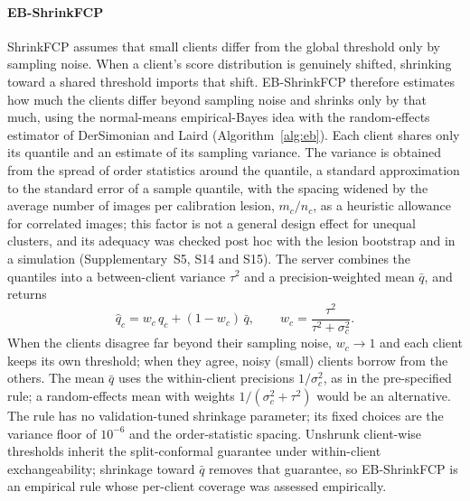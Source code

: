 \documentclass[VANCOUVER,Times1COL]{WileyNJDv5}
\begin{document}
\paragraph{EB-ShrinkFCP} ShrinkFCP assumes that small clients differ from the global threshold only by
sampling noise. When a client's score distribution is genuinely shifted, shrinking toward a shared
threshold imports that shift. EB-ShrinkFCP therefore estimates how much the clients differ beyond sampling
noise and shrinks only by that much, using the normal-means empirical-Bayes idea
\cite{efron1975stein} with the random-effects estimator of DerSimonian and Laird
\cite{dersimonian1986meta} (Algorithm~\ref{alg:eb}). Each client shares only its quantile and an estimate
of its sampling variance. The variance is obtained from the spread of order statistics around the
quantile, a standard approximation to the standard error of a sample quantile, with the spacing widened
by the average number of images per calibration lesion, $m_c/n_c$, as a heuristic allowance for
correlated images; this factor is not a general design effect for unequal clusters, and its adequacy was
checked post hoc with the lesion bootstrap and in a simulation (Supplementary~S5, S14 and S15). The server combines the quantiles into a
between-client variance $\tau^2$ and a precision-weighted mean $\bar q$, and returns
\begin{equation}
  \hat q_c = w_c\,q_c + (1-w_c)\,\bar q, \qquad w_c=\frac{\tau^2}{\tau^2+\sigma_c^2}.
  \label{eq:eb}
\end{equation}
When the clients disagree far beyond their sampling noise, $w_c\to1$ and each client keeps its own
threshold; when they agree, noisy (small) clients borrow from the others. The mean $\bar q$ uses the
within-client precisions $1/\sigma_c^2$, as in the pre-specified rule; a random-effects mean with weights
$1/(\sigma_c^2+\tau^2)$ would be an alternative. The rule has no validation-tuned shrinkage parameter; its
fixed choices are the variance floor of $10^{-6}$ and the order-statistic spacing. Unshrunk client-wise
thresholds inherit the split-conformal guarantee under within-client exchangeability; shrinkage toward
$\bar q$ removes that guarantee, so EB-ShrinkFCP is an empirical rule whose per-client coverage was
assessed empirically.
\end{document}
